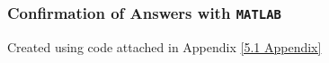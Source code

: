 \documentclass[hidelinks, 12pt]{article}%
\begin{document}
\subsubsection{Confirmation of Answers with \texttt{MATLAB}}
Created using code attached in Appendix \ref{5.1 Appendix}\\[5pt]


\end{document}
